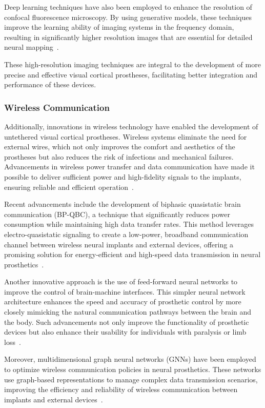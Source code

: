 \documentclass[twocolumn,10pt]{article}
\begin{document}
Deep learning techniques have also been employed to enhance the resolution of
confocal fluorescence microscopy. By using generative models, these techniques
improve the learning ability of imaging systems in the frequency domain,
resulting in significantly higher resolution images that are essential for
detailed neural mapping~\parencite{huangEnhancingImageResolution2023}.

These high-resolution imaging techniques are integral to the development of more
precise and effective visual cortical prostheses, facilitating better
integration and performance of these devices.

\subsubsection*{Wireless Communication}
Additionally, innovations in wireless technology have enabled the development of
untethered visual cortical prostheses. Wireless systems eliminate the need for
external wires, which not only improves the comfort and aesthetics of the
prostheses but also reduces the risk of infections and mechanical failures.
Advancements in wireless power transfer and data communication have made it
possible to deliver sufficient power and high-fidelity signals to the implants,
ensuring reliable and efficient
operation~\parencite{rosenfeldTissueResponseChronically2020}.

Recent advancements include the development of biphasic quasistatic brain
communication (BP-QBC), a technique that significantly reduces power consumption
while maintaining high data transfer rates. This method leverages
electro-quasistatic signaling to create a low-power, broadband communication
channel between wireless neural implants and external devices, offering a
promising solution for energy-efficient and high-speed data transmission in
neural prosthetics~\parencite{chatterjeeBiphasicQuasistaticBrain2023}.

Another innovative approach is the use of feed-forward neural networks to
improve the control of brain-machine interfaces. This simpler neural network
architecture enhances the speed and accuracy of prosthetic control by more
closely mimicking the natural communication pathways between the brain and the
body. Such advancements not only improve the functionality of prosthetic devices
but also enhance their usability for individuals with paralysis or limb
loss~\parencite{willseyRealtimeBrainmachineInterface2022}.

Moreover, multidimensional graph neural networks (GNNs) have been employed to
optimize wireless communication policies in neural prosthetics. These networks
use graph-based representations to manage complex data transmission scenarios,
improving the efficiency and reliability of wireless communication between
implants and external devices~\parencite{liuMultidimensionalGraphNeural2024}.
\end{document}
